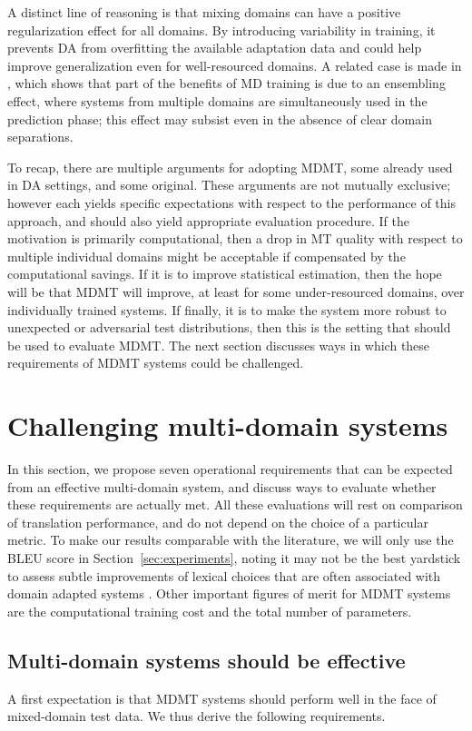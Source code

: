 A distinct line of reasoning is that mixing domains can have a positive regularization effect for all domains. By introducing variability in training, it prevents DA from overfitting the available adaptation data and could help improve generalization even for well-resourced domains. A related case is made in \cite{Joshi12multidomain}, which shows that part of the benefits of MD training is due to an ensembling effect, where systems from multiple domains are simultaneously used in the prediction phase; this effect may subsist even in the absence of clear domain separations.

To recap, there are multiple arguments for adopting MDMT, some already used in DA settings, and some original. These arguments are not mutually exclusive; however each yields specific expectations with respect to the performance of this approach, and should also yield appropriate evaluation procedure. If the motivation is primarily computational, then a drop in MT quality with respect to multiple individual domains might be acceptable if compensated by the computational savings. If it is to improve statistical estimation, then the hope will be that MDMT will improve, at least for some under-resourced domains, over individually trained systems. If finally, it is to make the system more robust to unexpected or adversarial test distributions, then this is the setting that should be used to evaluate MDMT. The next section discusses ways in which these requirements of MDMT systems could be challenged. 

\section{Challenging multi-domain systems \label{sec:challenging}}
In this section, we propose seven operational requirements that can be expected from an effective multi-domain system, and discuss ways to evaluate whether these requirements are actually met. All these evaluations will rest on comparison of translation performance, and do not depend on the choice of a particular metric. To make our results comparable with the literature, we will only use the BLEU score \cite{Papineni02bleu} in Section~\ref{sec:experiments}, noting it may not be the best yardstick to assess subtle improvements of lexical choices that are often associated with domain adapted systems \cite{Irvine13measuring}. Other important figures of merit for MDMT systems are the computational training cost and the total number of parameters.

\subsection{Multi-domain systems should be effective \label{ssec:effective}}
A first expectation is that MDMT systems should perform well in the face of mixed-domain test data. We thus derive the following requirements.

